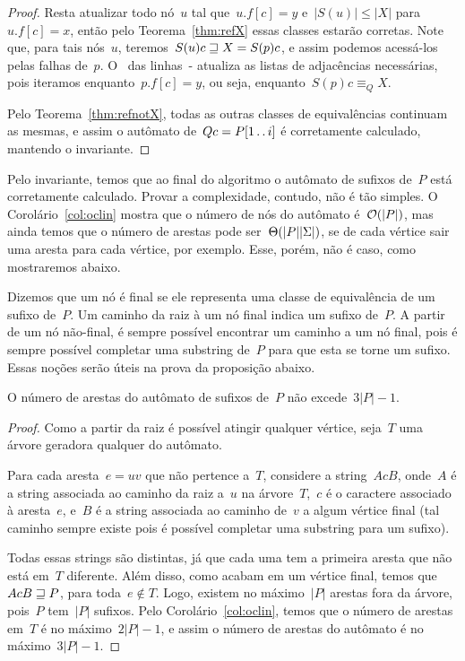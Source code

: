 \begin{proof}
Resta atualizar todo nó~$u$ tal que~$u.f[c] = y$ e~$|S(u)| \leq |X|$ para~$u.f[c] = x$, então pelo Teorema~\ref{thm:refX} essas classes estarão corretas. Note que, para tais nós~$u$, teremos~${S(u)c \sqsupseteq X = S(p)c}$, e assim podemos acessá-los pelas falhas de~$p$.
O~ das linhas~- atualiza as listas de adjacências necessárias, pois iteramos enquanto~${p.f[c] = y}$, ou seja, enquanto~${S(p)c \equiv_Q X}$.

Pelo Teorema~\ref{thm:refnotX}, todas as outras classes de equivalências continuam as mesmas, e assim o autômato de~$Qc = P[1\,.\,.\, i]$ é corretamente calculado, mantendo o invariante.
\end{proof}

Pelo invariante, temos que ao final do algoritmo o autômato de sufixos de~$P$ está corretamente calculado.
Provar a complexidade, contudo, não é tão simples. O Corolário~\ref{col:oclin} mostra que o número de nós do autômato é~$\mathcal{O}(|P|)$, mas ainda temos que o número de arestas pode ser~$\Theta(|P||\Sigma|)$, se de cada vértice sair uma aresta para cada vértice, por exemplo. Esse, porém, não é caso, como mostraremos abaixo.

Dizemos que um nó é final se ele representa uma classe de equivalência de um sufixo de~$P$. Um caminho da raiz à um nó final indica um sufixo de~$P$. A partir de um nó não-final, é sempre possível encontrar um caminho a um nó final, pois é sempre possível completar uma substring de~$P$ para que esta se torne um sufixo. Essas noções serão úteis na prova da proposição abaixo.

\begin{prop} \label{prop:arlin}
O número de arestas do autômato de sufixos de~$P$ não excede~$3|P| - 1$.
\end{prop}

\begin{proof}

Como a partir da raiz é possível atingir qualquer vértice, seja~$T$ uma árvore geradora qualquer do autômato.

Para cada aresta~${e = uv}$ que não pertence a~$T$, considere a string~$AcB$, onde~$A$ é a string associada ao caminho da raiz a~$u$ na árvore~$T$,~$c$ é o caractere associado à aresta~$e$, e~$B$ é a string associada ao caminho de~$v$ a algum vértice final (tal caminho sempre existe pois é possível completar uma substring para um sufixo).

Todas essas strings são distintas, já que cada uma tem a primeira aresta que não está em~$T$ diferente. Além disso, como acabam em um vértice final, temos que~${AcB \sqsupseteq P}$, para toda~${e \not\in T}$. Logo, existem no máximo~$|P|$ arestas fora da árvore, pois~$P$ tem~$|P|$ sufixos. Pelo Corolário~\ref{col:oclin}, temos que o número de arestas em~$T$ é no máximo~${2|P| - 1}$, e assim o número de arestas do autômato é no máximo~${3|P| - 1}$.
\end{proof}

